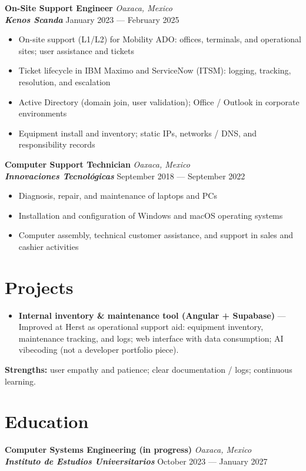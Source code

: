 \documentclass[10pt,letterpaper]{article}
\newcommand{\entry}[4]{
  \begin{minipage}[t]{\linewidth}
    \textbf{#1} \hfill \textit{#2} \\
    \textbf{\textit{#3}} \hfill #4
  \end{minipage}
}
\begin{document}
\entry
{On-Site Support Engineer}
{Oaxaca, Mexico}
{Kenos Scanda}
{January 2023 --- February 2025}
\begin{itemize}
	\item On-site support (L1/L2) for Mobility ADO: offices, terminals, and operational sites; user assistance and tickets
	\item Ticket lifecycle in IBM Maximo and ServiceNow (ITSM): logging, tracking, resolution, and escalation
	\item Active Directory (domain join, user validation); Office / Outlook in corporate environments
	\item Equipment install and inventory; static IPs, networks / DNS, and responsibility records
\end{itemize}

\entry
{Computer Support Technician}
{Oaxaca, Mexico}
{Innovaciones Tecnológicas}
{September 2018 --- September 2022}
\begin{itemize}
	\item Diagnosis, repair, and maintenance of laptops and PCs
	\item Installation and configuration of Windows and macOS operating systems
	\item Computer assembly, technical customer assistance, and support in sales and cashier activities
\end{itemize}

\section*{Projects}

\begin{itemize}
	\item \textbf{Internal inventory \& maintenance tool (Angular + Supabase)} --- Improved at Herst as operational support aid: equipment inventory, maintenance tracking, and logs; web interface with data consumption; AI vibecoding (not a developer portfolio piece).
\end{itemize}

\textbf{Strengths:} user empathy and patience; clear documentation / logs; continuous learning.

\section*{Education}

\entry
{Computer Systems Engineering (in progress)}
{Oaxaca, Mexico}
{Instituto de Estudios Universitarios}
{October 2023 --- January 2027}
\end{document}
